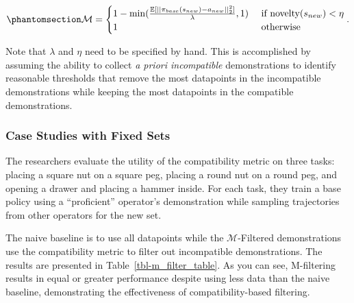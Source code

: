 \documentclass[
  letterpaper,
  numbers=noenddot,
  DIV=11]{scrreprt}
\theoremstyle{definition}
\theoremstyle{plain}
\theoremstyle{plain}
\theoremstyle{remark}
\begin{document}
\begin{equation}\phantomsection\label{eq-eq3.63}{\begin{aligned}
    \mathcal{M} = \begin{cases} 
        1 - \min(\frac{\mathbb{E}[|| \pi_{base}(s_{new}) - a_{new} ||^2_2]}{\lambda}, 1) & \text{ if } \text{novelty}(s_{new}) < \eta \\
        1 & \text{ otherwise }
       \end{cases}.
\end{aligned}}\end{equation}

Note that \(\lambda\) and \(\eta\) need to be specified by hand. This is
accomplished by assuming the ability to collect \emph{a priori
incompatible} demonstrations to identify reasonable thresholds that
remove the most datapoints in the incompatible demonstrations while
keeping the most datapoints in the compatible demonstrations.

\subsubsection*{Case Studies with Fixed
Sets}\label{case-studies-with-fixed-sets}

The researchers evaluate the utility of the compatibility metric on
three tasks: placing a square nut on a square peg, placing a round nut
on a round peg, and opening a drawer and placing a hammer inside. For
each task, they train a base policy using a ``proficient'' operator's
demonstration while sampling trajectories from other operators for the
new set.

The naive baseline is to use all datapoints while the
\(\mathcal{M}\)-Filtered demonstrations use the compatibility metric to
filter out incompatible demonstrations. The results are presented in
Table~\ref{tbl-m_filter_table}. As you can see, M-filtering results in
equal or greater performance despite using less data than the naive
baseline, demonstrating the effectiveness of compatibility-based
filtering.
\end{document}
